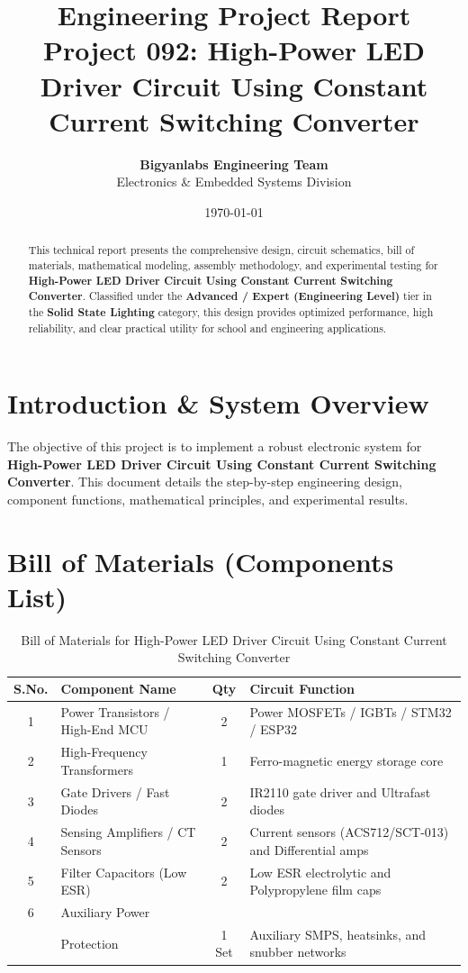 \documentclass[11pt,a4paper]{article}
\title{\textbf{\Huge Engineering Project Report}\\[0.5em] \Large Project 092: High-Power LED Driver Circuit Using Constant Current Switching Converter}
\author{\textbf{Bigyanlabs Engineering Team}\\ Electronics \& Embedded Systems Division}
\date{\today}
\begin{document}
\maketitle
\thispagestyle{empty}

\begin{abstract}
This technical report presents the comprehensive design, circuit schematics, bill of materials, mathematical modeling, assembly methodology, and experimental testing for \textbf{High-Power LED Driver Circuit Using Constant Current Switching Converter}. Classified under the \textbf{Advanced / Expert (Engineering Level)} tier in the \textbf{Solid State Lighting} category, this design provides optimized performance, high reliability, and clear practical utility for school and engineering applications.
\end{abstract}

\newpage
\tableofcontents
\newpage

\section{Introduction \& System Overview}
The objective of this project is to implement a robust electronic system for \textbf{High-Power LED Driver Circuit Using Constant Current Switching Converter}. This document details the step-by-step engineering design, component functions, mathematical principles, and experimental results.

\section{Bill of Materials (Components List)}
\begin{table}[h!]
\centering
\caption{Bill of Materials for High-Power LED Driver Circuit Using Constant Current Switching Converter}
\vspace{0.5em}
\begin{tabular}{clcp{7cm}}
\toprule
\textbf{S.No.} & \textbf{Component Name} & \textbf{Qty} & \textbf{Circuit Function} \\
\midrule
1 & Power Transistors / High-End MCU & 2 & Power MOSFETs / IGBTs / STM32 / ESP32 \\
2 & High-Frequency Transformers & 1 & Ferro-magnetic energy storage core \\
3 & Gate Drivers / Fast Diodes & 2 & IR2110 gate driver and Ultrafast diodes \\
4 & Sensing Amplifiers / CT Sensors & 2 & Current sensors (ACS712/SCT-013) and Differential amps \\
5 & Filter Capacitors (Low ESR) & 2 & Low ESR electrolytic and Polypropylene film caps \\
6 & Auxiliary Power \\& Protection & 1 Set & Auxiliary SMPS, heatsinks, and snubber networks \\
\bottomrule
\end{tabular}
\end{table}
\end{document}
